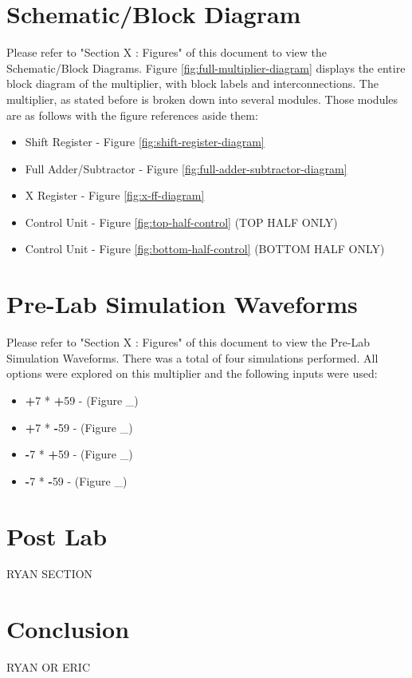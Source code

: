 \documentclass[journal, twocolumn, final,11pt,letterpaper]{IEEEtran}
\begin{document}
\section{Schematic/Block Diagram}
Please refer to "Section X : Figures" of this document to view the Schematic/Block Diagrams. Figure \ref{fig:full-multiplier-diagram} displays the entire block diagram of the multiplier, with block labels and interconnections. The multiplier, as stated before is broken down into several modules. Those modules are as follows with the figure references aside them:
\begin{itemize}
	\item Shift Register - Figure \ref{fig:shift-register-diagram}
	\item Full Adder/Subtractor - Figure \ref{fig:full-adder-subtractor-diagram}
	\item X Register - Figure \ref{fig:x-ff-diagram}
	\item Control Unit - Figure \ref{fig:top-half-control} (TOP HALF ONLY)
	\item Control Unit - Figure \ref{fig:bottom-half-control} (BOTTOM HALF ONLY)
\end{itemize}

\section{Pre-Lab Simulation Waveforms}
Please refer to "Section X : Figures" of this document to view the Pre-Lab Simulation Waveforms. There was a total of four simulations performed. All options were explored on this multiplier and the following inputs were used: 
\begin{itemize}
	\item \textbf{+}7 * \textbf{+}59 - (Figure \_)
	\item \textbf{+}7 * \textbf{-}59 - (Figure \_)
	\item \textbf{-}7 * \textbf{+}59 - (Figure \_)
	\item \textbf{-}7 * \textbf{-}59 - (Figure \_)
\end{itemize}
\section{Post Lab}
RYAN SECTION

\section{Conclusion}
RYAN OR ERIC
\end{document}
